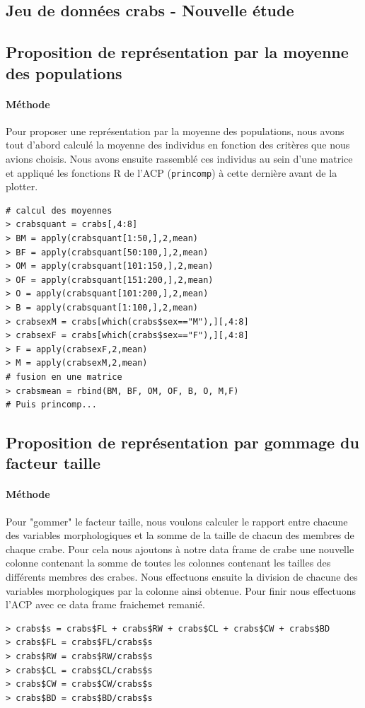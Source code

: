\documentclass{report}
\begin{document}
\begin{appendices}
\section{Jeu de données crabs - Nouvelle étude}
\subsection{Proposition de représentation par la moyenne des populations}
\paragraph{Méthode}
Pour proposer une représentation par la moyenne des populations, nous avons tout d'abord calculé la moyenne des individus en fonction des critères que nous avions choisis. Nous avons ensuite rassemblé ces individus au sein d'une matrice et appliqué les fonctions R de l'ACP (\verb+princomp+) à cette dernière avant de la plotter.
\begin{lstlisting}
# calcul des moyennes
> crabsquant = crabs[,4:8]
> BM = apply(crabsquant[1:50,],2,mean)
> BF = apply(crabsquant[50:100,],2,mean)
> OM = apply(crabsquant[101:150,],2,mean)
> OF = apply(crabsquant[151:200,],2,mean)
> O = apply(crabsquant[101:200,],2,mean)
> B = apply(crabsquant[1:100,],2,mean)
> crabsexM = crabs[which(crabs$sex=="M"),][,4:8]
> crabsexF = crabs[which(crabs$sex=="F"),][,4:8]
> F = apply(crabsexF,2,mean)
> M = apply(crabsexM,2,mean)
# fusion en une matrice
> crabsmean = rbind(BM, BF, OM, OF, B, O, M,F)
# Puis princomp...
\end{lstlisting}
\subsection{Proposition de représentation par gommage du facteur taille}
\paragraph{Méthode}
Pour "gommer" le facteur taille, nous voulons calculer le rapport entre chacune des variables morphologiques et la somme de la taille de chacun des membres de chaque crabe. Pour cela nous ajoutons à notre data frame de crabe une nouvelle colonne contenant la somme de toutes les colonnes contenant les tailles des différents membres des crabes. Nous effectuons ensuite la division de chacune des variables morphologiques par la colonne ainsi obtenue. Pour finir nous effectuons l'ACP avec ce data frame fraichemet remanié.
\begin{lstlisting}
> crabs$s = crabs$FL + crabs$RW + crabs$CL + crabs$CW + crabs$BD
> crabs$FL = crabs$FL/crabs$s
> crabs$RW = crabs$RW/crabs$s
> crabs$CL = crabs$CL/crabs$s
> crabs$CW = crabs$CW/crabs$s
> crabs$BD = crabs$BD/crabs$s
\end{lstlisting}

\end{appendices}
\end{document}
